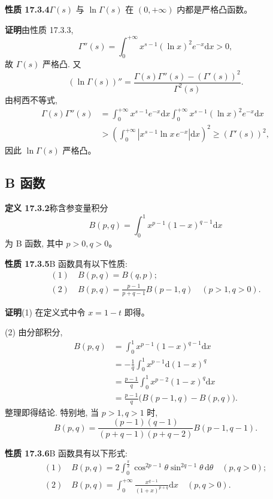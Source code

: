 \documentclass[UTF8,12pt,a4paper,fontset=fandol]{ctexart}
\begin{document}
\noindent\textbf{性质 17.3.4}\quad $\Gamma(s)$ 与 $\ln\Gamma(s)$ 在 $(0,+\infty)$ 内都是严格凸函数。

\noindent\textbf{证明}\quad 由性质 17.3.3,
\[
  \Gamma''(s)=\int_0^{+\infty}x^{s-1}(\ln x)^2e^{-x}\mathrm dx>0,
\]
故 $\Gamma(s)$ 严格凸. 又
\[
  (\ln\Gamma(s))''=\frac{\Gamma(s)\Gamma''(s)-(\Gamma'(s))^2}{\Gamma^2(s)}.
\]
由柯西不等式,
\[
\begin{aligned}
  \Gamma(s)\Gamma''(s)
  &=
  \int_0^{+\infty}x^{s-1}e^{-x}\mathrm dx
  \int_0^{+\infty}x^{s-1}(\ln x)^2e^{-x}\mathrm dx\\
  &>
  \left(\int_0^{+\infty}|x^{s-1}\ln x\,e^{-x}|\mathrm dx\right)^2
  \geqslant(\Gamma'(s))^2,
\end{aligned}
\]
因此 $\ln\Gamma(s)$ 严格凸。

\subsection{B 函数}

\noindent\textbf{定义 17.3.2}\quad 称含参变量积分
\[
  B(p,q)=\int_0^1x^{p-1}(1-x)^{q-1}\mathrm dx
\]
为 B 函数, 其中 $p>0,q>0$。

\noindent\textbf{性质 17.3.5}\quad B 函数具有以下性质:
\[
\begin{gathered}
  (1)\quad B(p,q)=B(q,p);\\
  (2)\quad B(p,q)=\frac{p-1}{p+q-1}B(p-1,q)\quad(p>1,q>0).
\end{gathered}
\]

\noindent\textbf{证明}\quad (1) 在定义式中令 $x=1-t$ 即得。

(2) 由分部积分,
\[
\begin{aligned}
  B(p,q)
  &=\int_0^1x^{p-1}(1-x)^{q-1}\mathrm dx\\
  &=-\frac1q\int_0^1x^{p-1}\mathrm d(1-x)^q\\
  &=\frac{p-1}{q}\int_0^1x^{p-2}(1-x)^q\mathrm dx\\
  &=\frac{p-1}{q}\bigl(B(p-1,q)-B(p,q)\bigr).
\end{aligned}
\]
整理即得结论. 特别地, 当 $p>1,q>1$ 时,
\[
  B(p,q)=\frac{(p-1)(q-1)}{(p+q-1)(p+q-2)}B(p-1,q-1).
\]

\noindent\textbf{性质 17.3.6}\quad B 函数具有以下形式:
\[
\begin{gathered}
  (1)\quad B(p,q)=2\int_0^{\frac\pi2}\cos^{2p-1}\theta\sin^{2q-1}\theta\,\mathrm d\theta\quad(p,q>0);\\
  (2)\quad B(p,q)=\int_0^{+\infty}\frac{x^{q-1}}{(1+x)^{p+q}}\mathrm dx\quad(p,q>0).
\end{gathered}
\]
\end{document}
